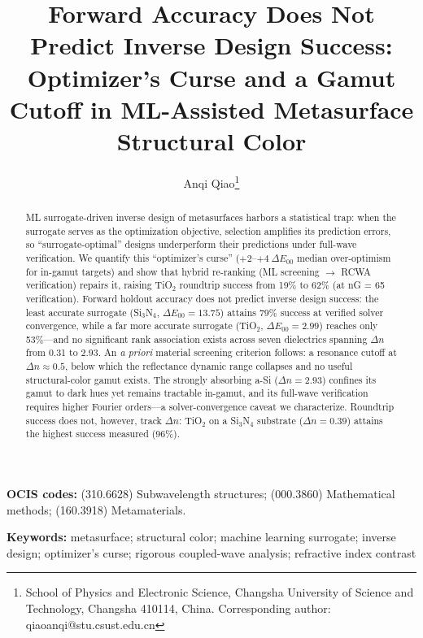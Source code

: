 \documentclass[10pt,twocolumn]{article}
\begin{document}
\title{Forward Accuracy Does Not Predict Inverse Design Success: Optimizer's Curse and a Gamut Cutoff in ML-Assisted Metasurface Structural Color}

\author{Anqi Qiao\thanks{School of Physics and Electronic Science, Changsha University of Science and Technology, Changsha 410114, China. Corresponding author: qiaoanqi@stu.csust.edu.cn}}

\maketitle

\begin{abstract}
ML surrogate-driven inverse design of metasurfaces harbors a statistical trap: when the surrogate serves as the optimization objective, selection amplifies its prediction errors, so ``surrogate-optimal'' designs underperform their predictions under full-wave verification. We quantify this ``optimizer's curse'' ($+2$--$+4\ \Delta E_{00}$ median over-optimism for in-gamut targets) and show that hybrid re-ranking (ML screening $\to$ RCWA verification) repairs it, raising TiO$_2$ roundtrip success from 19\% to 62\% (at nG = 65 verification). Forward holdout accuracy does not predict inverse design success: the least accurate surrogate (Si$_3$N$_4$, $\Delta E_{00} = 13.75$) attains 79\% success at verified solver convergence, while a far more accurate surrogate (TiO$_2$, $\Delta E_{00} = 2.99$) reaches only 53\%---and no significant rank association exists across seven dielectrics spanning $\Delta n$ from 0.31 to 2.93. An \textit{a priori} material screening criterion follows: a resonance cutoff at $\Delta n \approx 0.5$, below which the reflectance dynamic range collapses and no useful structural-color gamut exists. The strongly absorbing a-Si ($\Delta n = 2.93$) confines its gamut to dark hues yet remains tractable in-gamut, and its full-wave verification requires higher Fourier orders---a solver-convergence caveat we characterize. Roundtrip success does not, however, track $\Delta n$: TiO$_2$ on a Si$_3$N$_4$ substrate ($\Delta n = 0.39$) attains the highest success measured (96\%).
\end{abstract}

\noindent\textbf{OCIS codes:} (310.6628) Subwavelength structures; (000.3860) Mathematical methods; (160.3918) Metamaterials.

\noindent\textbf{Keywords:} metasurface; structural color; machine learning surrogate; inverse design; optimizer's curse; rigorous coupled-wave analysis; refractive index contrast
\end{document}
